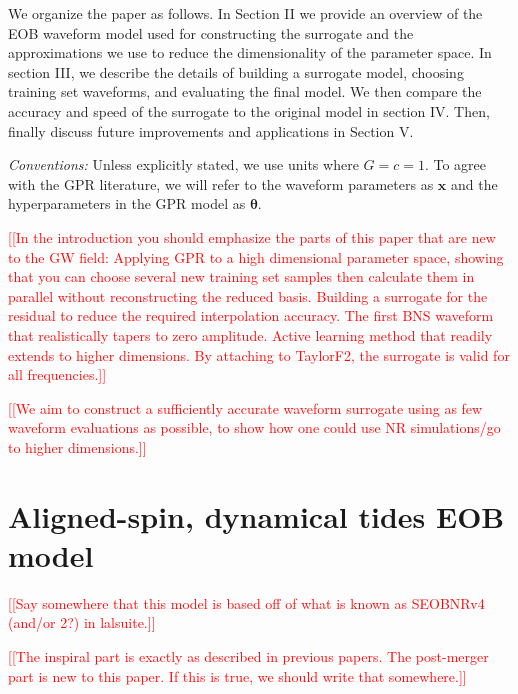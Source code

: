 \documentclass[prd,aps,letter,twocolumn,floatfix,notitlepage,nofootinbib]{revtex4-1}
\def\bx{\mathbf{x}}
\def\btheta{\boldsymbol{\theta}}
\newcommand{\red}[1]{\textcolor{red}{#1}}
\begin{document}
We organize the paper as follows. In Section II we provide an overview of the EOB waveform model used for constructing the surrogate and the approximations we use to reduce the dimensionality of the parameter space. In section III, we describe the details of building a surrogate model, choosing training set waveforms, and evaluating the final model. We then compare the accuracy and speed of the surrogate to the original model in section IV. Then, finally discuss future improvements and applications in Section V.

\textit{Conventions:} Unless explicitly stated, we use units where $G=c=1$. To agree with the GPR literature, we will refer to the waveform parameters as $\bx$ and the hyperparameters in the GPR model as $\btheta$.

\red{[[In the introduction you should emphasize the parts of this paper that are new to the GW field: Applying GPR to a high dimensional parameter space, showing that you can choose several new training set samples then calculate them in parallel without reconstructing the reduced basis. Building a surrogate for the residual to reduce the required interpolation accuracy. The first BNS waveform that realistically tapers to zero amplitude. Active learning method that readily extends to higher dimensions. By attaching to TaylorF2, the surrogate is valid for all frequencies.]]}

\red{[[We aim to construct a sufficiently accurate waveform surrogate using as few waveform evaluations as possible, to show how one could use NR simulations/go to higher dimensions.]]}

\section{Aligned-spin, dynamical tides EOB model}

\red{[[Say somewhere that this model is based off of what is known as SEOBNRv4 (and/or 2?) in lalsuite.]]}

\red{[[The inspiral part is exactly as described in previous papers. The post-merger part is new to this paper. If this is true, we should write that somewhere.]]}
\end{document}
